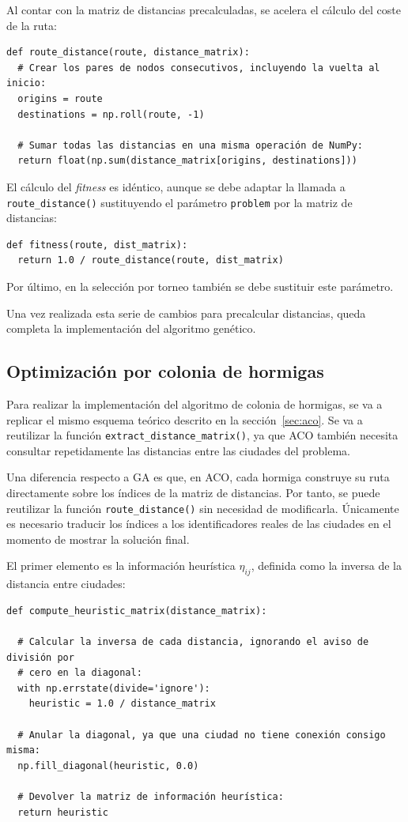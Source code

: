 Al contar con la matriz de distancias precalculadas, se acelera el cálculo del coste de la ruta:
\newline
\begin{lstlisting}[style=PythonStyle]
def route_distance(route, distance_matrix):
  # Crear los pares de nodos consecutivos, incluyendo la vuelta al inicio:
  origins = route
  destinations = np.roll(route, -1)
  
  # Sumar todas las distancias en una misma operación de NumPy:
  return float(np.sum(distance_matrix[origins, destinations]))
\end{lstlisting}

El cálculo del \textit{fitness} es idéntico, aunque se debe adaptar la llamada a \texttt{route\_distance()} sustituyendo
el parámetro \texttt{problem} por la matriz de distancias:
\newline
\begin{lstlisting}[style=PythonStyle]
def fitness(route, dist_matrix):
  return 1.0 / route_distance(route, dist_matrix)
\end{lstlisting}

Por último, en la selección por torneo también se debe sustituir este parámetro.

Una vez realizada esta serie de cambios para precalcular distancias, queda completa la implementación del algoritmo genético.

\subsection{Optimización por colonia de hormigas}
\label{subsec:aco_imp}

Para realizar la implementación del algoritmo de colonia de hormigas, se va a replicar el mismo esquema teórico descrito en la 
sección~\ref{sec:aco}. Se va a reutilizar la función \texttt{extract\_distance\_matrix()}, ya que ACO también necesita consultar
repetidamente las distancias entre las ciudades del problema.

Una diferencia respecto a GA es que, en ACO, cada hormiga construye su ruta directamente sobre los índices de la matriz de 
distancias. Por tanto, se puede reutilizar la función \texttt{route\_distance()} sin necesidad de modificarla. Únicamente es 
necesario traducir los índices a los identificadores reales de las ciudades en el momento de mostrar la solución final.

El primer elemento es la información heurística $\eta_{ij}$, definida como la inversa de la distancia entre ciudades:
\newline
\begin{lstlisting}[style=PythonStyle]
def compute_heuristic_matrix(distance_matrix):
 
  # Calcular la inversa de cada distancia, ignorando el aviso de división por
  # cero en la diagonal:
  with np.errstate(divide='ignore'):
    heuristic = 1.0 / distance_matrix
 
  # Anular la diagonal, ya que una ciudad no tiene conexión consigo misma:
  np.fill_diagonal(heuristic, 0.0)
 
  # Devolver la matriz de información heurística:
  return heuristic
\end{lstlisting}


